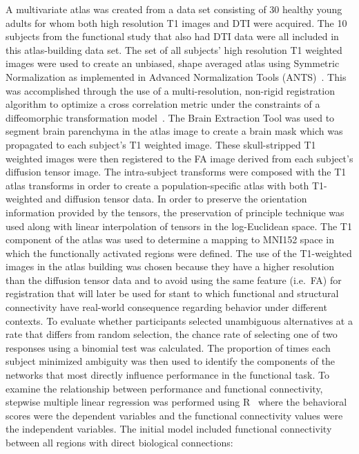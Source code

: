 \documentclass[final,authoryear,5p,times,twocolumn]{elsarticle}
\begin{document}
A multivariate atlas was created from a data set consisting of 30 healthy young adults for whom both high resolution T1 images and DTI were acquired. The 10 subjects from the functional study that also had DTI data were all included in this atlas-building data set. The set of all subjects' high resolution T1 weighted images were used to create an unbiased, shape averaged atlas using Symmetric Normalization as implemented in Advanced Normalization Tools (ANTS)~\citep{ANTS}. This was accomplished through the use of a multi-resolution, non-rigid registration algorithm to optimize a cross correlation metric under the constraints of a diffeomorphic transformation model~\citep{Avants2006}. The Brain Extraction Tool \citep{Smith2002} was used to segment brain parenchyma in the atlas image to create a brain mask which was propagated to each subject's T1 weighted image.  These skull-stripped T1 weighted images were then registered to the FA image derived from each subject's diffusion tensor image. The intra-subject transforms were composed with the T1 atlas transforms in order to create a population-specific atlas with both T1-weighted and diffusion tensor data. In order to preserve the orientation information provided by the tensors, the preservation of principle technique was used along with linear interpolation of tensors in the log-Euclidean space. The T1 component of the atlas was used to determine a mapping to MNI152 space in which the functionally activated regions were defined. The use of the T1-weighted images in the atlas building was chosen because they have a higher resolution than the diffusion tensor data and to avoid using the same feature (i.e.\ FA) for registration that will later be used for stant to which functional and structural connectivity have real-world consequence regarding behavior under different contexts. To evaluate whether participants selected unambiguous alternatives at a rate that differs from random selection, the chance rate of selecting one of two responses using a binomial test was calculated. The proportion of times each subject minimized ambiguity was then used to identify the components of the networks that most directly influence performance in the functional task. To examine the relationship between performance and functional connectivity, stepwise multiple linear regression was performed using R~\citep{RStats} where the behavioral scores were the dependent variables and the functional connectivity values were the independent variables.  The initial model included functional connectivity between all regions with direct biological connections:
\end{document}
